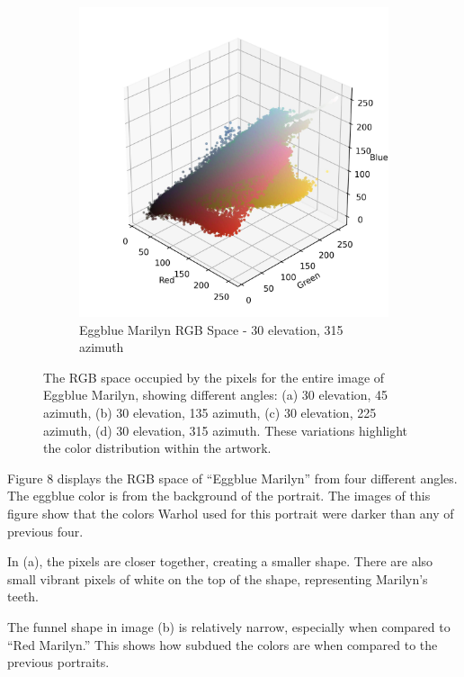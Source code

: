 \documentclass{article}
\begin{document}
\begin{figure}[ht]
\begin{subfigure}{0.45\textwidth}
    \includegraphics[width=\textwidth]{main_files/figure-latex/4_20_eggblue_marilyn_original_scatter.jpg}
    \caption{Eggblue Marilyn RGB Space - 30 \degree elevation, 315 \degree azimuth}
    \label{fig:4_20_eggblue_marilyn_original_scatter}
  \end{subfigure}
  \caption{The RGB space occupied by the pixels for the entire image of Eggblue Marilyn, showing different angles: (a) 30 \degree elevation, 45 \degree azimuth, (b) 30 \degree elevation, 135 \degree azimuth, (c) 30 \degree elevation, 225 \degree azimuth, (d) 30 \degree elevation, 315 \degree azimuth. These variations highlight the color distribution within the artwork.}
  \label{fig:eggblue_marilyn_original_scatter_2}
\end{figure}

Figure 8 displays the RGB space of ``Eggblue Marilyn'' from four
different angles. The eggblue color is from the background of the
portrait. The images of this figure show that the colors Warhol used for
this portrait were darker than any of previous four.

In (a), the pixels are closer together, creating a smaller shape. There
are also small vibrant pixels of white on the top of the shape,
representing Marilyn's teeth.

The funnel shape in image (b) is relatively narrow, especially when
compared to ``Red Marilyn.'' This shows how subdued the colors are when
compared to the previous portraits.
\end{document}
